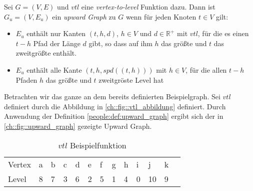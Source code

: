 \begin{definition}\label{people:def:upward_graph}
    Sei $G = (V, E)$ und ${vtl}$ eine \emph{vertex-to-level} Funktion dazu. Dann ist $G_u = (V, E_u)$ ein \emph{upward Graph} zu $G$ wenn für jeden Knoten $t \in V$ gilt:

    \begin{itemize}
        \item
              $E_u$ enthält nur Kanten $(t, h, d)$, $h \in V$ und $d \in \mathbb{R}^+$ mit ${vtl}$, für die es einen $t-h$ Pfad der Länge $d$ gibt, so dass auf ihm $h$ das größte und $t$ das zweitgrößte enthält.

        \item
              $E_u$ enthält alle Kante $(t, h, {spd}((t, h)))$ mit $h \in V$, für die allen $t-h$ Pfaden $h$ das größte und $t$ zweitgröste Level hat
    \end{itemize}
\end{definition}

Betrachten wir das ganze an dem bereits definierten Beispielgraph.
Sei ${vtl}$ definiert durch die Abbildung in \autoref{ch::fig::vtl_abbildung} definiert.
Durch Anwendung der Definition \ref{people:def:upward_graph} ergibt sich der in \autoref{ch::fig::upward_graph} gezeigte Upward Graph.

\begin{table}[ht]
    \centering
    \begin{tabular}{lllllllllllll}
        Vertex & a & b & c & d & e & f & g & h & i & j  & k & \\
        Level  & 8 & 7 & 3 & 6 & 2 & 5 & 1 & 4 & 0 & 10 & 9 &
    \end{tabular}
    \caption{${vtl}$ Beispielfunktion}
    \label{ch::fig::vtl_abbildung}
\end{table}


